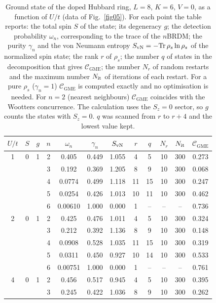 \documentclass[12pt]{article}
\begin{document}
\begin{table}
\caption{Ground state of the doped Hubbard ring, $L=8$, $K=6$, $V=0$, as a function of $U/t$ (data of Fig.~\ref{fig05}). For each point the table reports: the total spin $S$ of the state; its degeneracy $g$; the detection probability $\omega_n$, corresponding to the trace of the $n$BRDM; the purity $\gamma_n$ and the von Neumann entropy $S_{\rm vN}=-\mathrm{Tr}\,\rho_s\ln\rho_s$ of the normalized spin state; the rank $r$ of $\rho_s$; the number $q$ of states in the decomposition that gives $\mathcal{C}_{\mathrm{GME}}$; the number $N_r$ of random restarts and the maximum number $N_{\rm it}$ of iterations of each restart. For a pure $\rho_s$ ($\gamma_n=1$) $\mathcal{C}_{\mathrm{GME}}$ is computed exactly and no optimisation is needed. For $n=2$ (nearest neighbours) $\mathcal{C}_{\mathrm{GME}}$ coincides with the Wootters concurrence. The calculation uses the $S_z=0$ sector, so $g$ counts the states with $S_z=0$. $q$ was scanned from $r$ to $r+4$ and the lowest value kept.}
\label{tab:doped_U}
\begin{ruledtabular}
\begin{tabular}{cccccccccccc}
$U/t$ & $S$ & $g$ & $n$ & $\omega_n$ & $\gamma_n$ & $S_{\rm vN}$ & $r$ & $q$ & $N_r$ & $N_{\rm it}$ & $\mathcal{C}_{\mathrm{GME}}$ \\
\hline
1 & 0 & 1 & 2 & 0.405 & 0.449 & 1.055 & 4 & 5 & 10 & 300 & 0.273 \\
 & &  & 3 & 0.192 & 0.369 & 1.205 & 8 & 9 & 10 & 300 & 0.068 \\
 & &  & 4 & 0.0774 & 0.499 & 1.118 & 11 & 15 & 10 & 300 & 0.247 \\
 & &  & 5 & 0.0254 & 0.426 & 1.013 & 10 & 11 & 10 & 300 & 0.462 \\
 & &  & 6 & 0.00610 & 1.000 & 0.000 & 1 & -- & -- & -- & 0.736 \\
\hline
2 & 0 & 1 & 2 & 0.425 & 0.476 & 1.011 & 4 & 5 & 10 & 300 & 0.324 \\
 & &  & 3 & 0.212 & 0.392 & 1.136 & 8 & 9 & 10 & 300 & 0.148 \\
 & &  & 4 & 0.0908 & 0.528 & 1.035 & 11 & 15 & 10 & 300 & 0.319 \\
 & &  & 5 & 0.0311 & 0.450 & 0.927 & 10 & 14 & 10 & 300 & 0.533 \\
 & &  & 6 & 0.00751 & 1.000 & 0.000 & 1 & -- & -- & -- & 0.761 \\
\hline
4 & 0 & 1 & 2 & 0.456 & 0.517 & 0.945 & 4 & 5 & 10 & 300 & 0.395 \\
 & &  & 3 & 0.245 & 0.422 & 1.036 & 8 & 9 & 10 & 300 & 0.262 \\

\end{tabular}
\end{ruledtabular}
\end{table}
\end{document}
